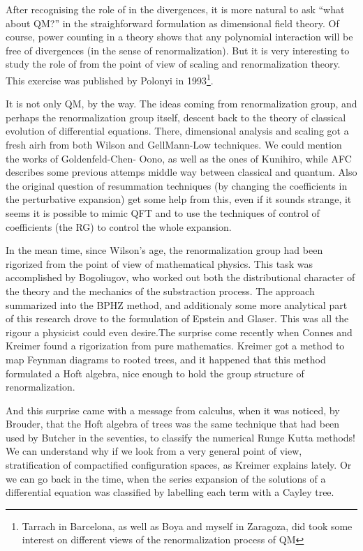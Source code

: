 \documentclass[a4paper,a4paper]{article}
\begin{document}
After recognising the role of \coordHE{} in the divergences, it is more natural to ask ``what about 
QM?'' in the straighforward formulation as \coordHE{} dimensional field theory. Of course, power
 counting in a \coordHE{} theory shows that any polynomial interaction 
will be free of divergences (in the sense of renormalization). But it is very interesting to 
study the role of \coordHE{}  from the point of view of scaling and renormalization theory. This 
exercise was published by Polonyi\cite{polonyi} in 1993\footnote{Tarrach in Barcelona, 
as well as Boya and myself in Zaragoza, did took some interest on different views of the 
renormalization process of QM}.

It is not only QM, by the way. The ideas coming from renormalization group, and perhaps 
the renormalization group itself, descent back to the theory of classical evolution of 
differential equations. There, dimensional analysis and scaling got a fresh airh from both 
Wilson and GellMann-Low techniques. We could mention the works of Goldenfeld-Chen-
Oono\cite{gco}, as well as the ones of Kunihiro, while AFC describes some previous 
attemps middle way between classical and quantum. Also the original question of 
resummation techniques (by changing the coefficients in the perturbative expansion) get 
some help from this, even if it  sounds strange, it seems it is possible to mimic QFT and to 
use the techniques of control of coefficients (the RG) to control the whole expansion.

In the mean time, since Wilson's age, the renormalization group had been rigorized from the 
point of view of mathematical physics. This task was accomplished by Bogoliugov, who 
worked out both the distributional character of the theory and the mechanics of the 
substraction process. The approach summarized into the BPHZ method, and additionaly 
some more analytical part of this research drove to the formulation of Epstein and Glaser. 
This was all the rigour a physicist could even desire.The surprise come recently when 
Connes and Kreimer found a rigorization from pure mathematics. Kreimer got a method to 
map Feynman diagrams to rooted trees, and it happened that this method formulated a Hoft 
algebra, nice enough to hold the group structure of renormalization. 

And this surprise came with a message from calculus, when it was noticed, by 
Brouder\cite{brouder}, that the Hoft algebra of trees was the same technique that had been 
used by Butcher in the seventies, to classify the numerical Runge Kutta methods! We can 
understand why if we look from a very general point of view, stratification of compactified 
configuration spaces, as Kreimer explains lately. Or we can go back in the time, when the 
series expansion of the solutions of a differential equation was classified by labelling each 
term with a Cayley  tree.
\end{document}
